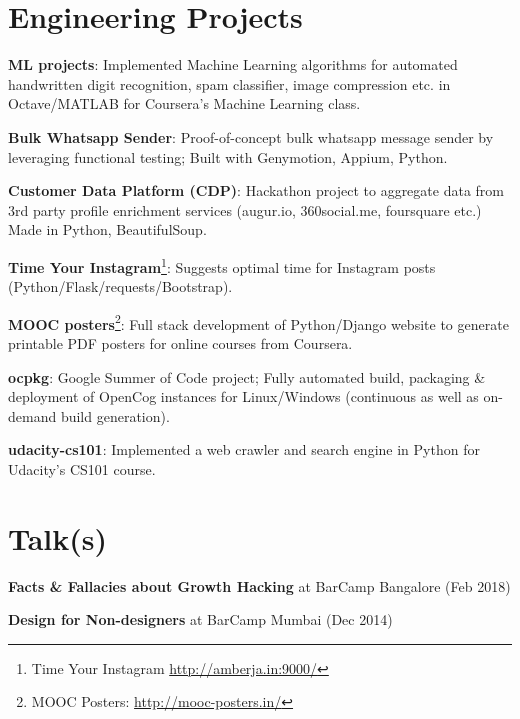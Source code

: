 \documentclass[overlapped,centered]{resume}
\begin{document}
\begin{resume}
    \section{\mysidestyle Engineering Projects} 
	\begin{list2}
	
	\item \textbf{ML projects}: Implemented Machine Learning algorithms for automated handwritten digit recognition, spam classifier, image compression etc. in Octave/MATLAB for Coursera's Machine Learning class.
	
	\item \textbf{Bulk Whatsapp Sender}: Proof-of-concept bulk whatsapp message sender by leveraging functional testing; Built with Genymotion, Appium, Python.
	
	\item \textbf{Customer Data Platform (CDP)}: Hackathon project to aggregate data from 3rd party profile enrichment services (augur.io, 360social.me, foursquare etc.) Made in Python, BeautifulSoup.
	
	\item \textbf{Time Your Instagram}\footnote{Time Your Instagram \url{http://amberja.in:9000/}}: Suggests optimal time for Instagram posts (Python/Flask/requests/Bootstrap).
	
	\item \textbf{MOOC posters}\footnote{MOOC Posters: \url{http://mooc-posters.in/}}: Full stack development of Python/Django website to generate printable PDF posters for online courses from Coursera.
	
	\item \textbf{ocpkg}: Google Summer of Code project; Fully automated build, packaging \& deployment of OpenCog instances for Linux/Windows (continuous as well as on-demand build generation).
	
	\item \textbf{udacity-cs101}: Implemented a web crawler and search engine in Python for Udacity's CS101 course.
	
    \end{list2}

	\section{\mysidestyle Talk(s)}
	\begin{list2}
	\item \textbf{Facts \& Fallacies about Growth Hacking} at BarCamp Bangalore (Feb 2018)
	\item \textbf{Design for Non-designers} at BarCamp Mumbai (Dec 2014)
	\end{list2}


\end{resume}
\end{document}
